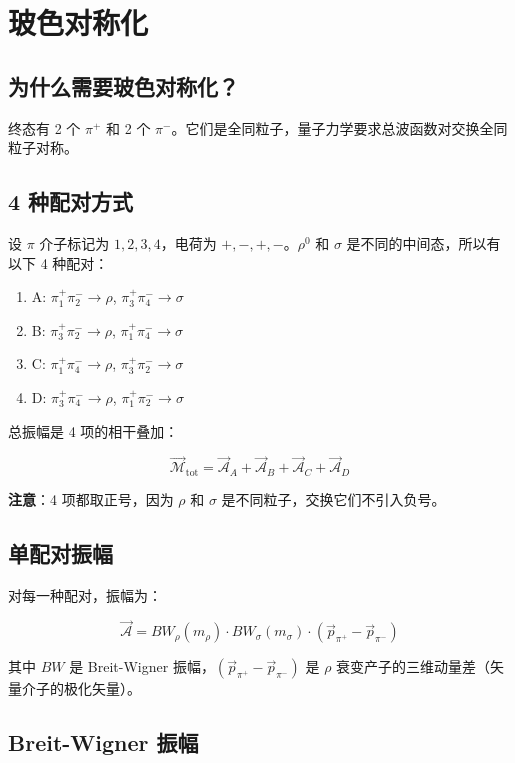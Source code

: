 \documentclass[11pt,a4paper,UTF8]{ctexart}
\begin{document}
\section{玻色对称化}

\subsection{为什么需要玻色对称化？}

终态有 2 个 $\pi^+$ 和 2 个 $\pi^-$。它们是全同粒子，量子力学要求总波函数对交换全同粒子对称。

\subsection{4 种配对方式}

设 $\pi$ 介子标记为 $1,2,3,4$，电荷为 $+,-,+,-$。$\rho^0$ 和 $\sigma$ 是不同的中间态，所以有以下 4 种配对：

\begin{enumerate}[leftmargin=2em]
    \item A: $\pi_1^+ \pi_2^- \to \rho$, $\pi_3^+ \pi_4^- \to \sigma$
    \item B: $\pi_3^+ \pi_2^- \to \rho$, $\pi_1^+ \pi_4^- \to \sigma$
    \item C: $\pi_1^+ \pi_4^- \to \rho$, $\pi_3^+ \pi_2^- \to \sigma$
    \item D: $\pi_3^+ \pi_4^- \to \rho$, $\pi_1^+ \pi_2^- \to \sigma$
\end{enumerate}

总振幅是 4 项的相干叠加：

\[
\vec{\mathcal{M}}_{\text{tot}} = \vec{\mathcal{A}}_A + \vec{\mathcal{A}}_B + \vec{\mathcal{A}}_C + \vec{\mathcal{A}}_D
\]

\textbf{注意}：4 项都取正号，因为 $\rho$ 和 $\sigma$ 是不同粒子，交换它们不引入负号。

\subsection{单配对振幅}

对每一种配对，振幅为：

\[
\vec{\mathcal{A}} = BW_\rho(m_{\rho}) \cdot BW_\sigma(m_{\sigma}) \cdot (\vec{p}_{\pi^+} - \vec{p}_{\pi^-})
\]

其中 $BW$ 是 Breit-Wigner 振幅，$(\vec{p}_{\pi^+} - \vec{p}_{\pi^-})$ 是 $\rho$ 衰变产子的三维动量差（矢量介子的极化矢量）。

\subsection{Breit-Wigner 振幅}
\end{document}
